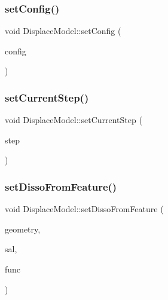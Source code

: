 \mbox{\label{class_displace_model_a7576065fbd4fdc52099dfc50e6724d74}} 
\subsubsection{\texorpdfstring{setConfig()}{setConfig()}}
{\footnotesize\ttfamily void Displace\+Model\+::set\+Config (\begin{DoxyParamCaption}\item[{const \mbox{\hyperlink{class_config}{Config}} \&}]{config }\end{DoxyParamCaption})}

\mbox{\label{class_displace_model_a5e08e5cd4b5ddfeba8e903881d3e78b5}} 
\subsubsection{\texorpdfstring{setCurrentStep()}{setCurrentStep()}}
{\footnotesize\ttfamily void Displace\+Model\+::set\+Current\+Step (\begin{DoxyParamCaption}\item[{int}]{step }\end{DoxyParamCaption})}

\mbox{\label{class_displace_model_a6269ebf1aa93a4451dd88e08a197f504}} 
\subsubsection{\texorpdfstring{setDissoFromFeature()}{setDissoFromFeature()}}
{\footnotesize\ttfamily void Displace\+Model\+::set\+Disso\+From\+Feature (\begin{DoxyParamCaption}\item[{O\+G\+R\+Geometry $\ast$}]{geometry,  }\item[{double}]{sal,  }\item[{std\+::function$<$ void(std\+::shared\+\_\+ptr$<$ \mbox{\hyperlink{class_node_data}{Node\+Data}} $>$, int)$>$}]{func }\end{DoxyParamCaption})\hspace{0.3cm}{\ttfamily [protected]}}

